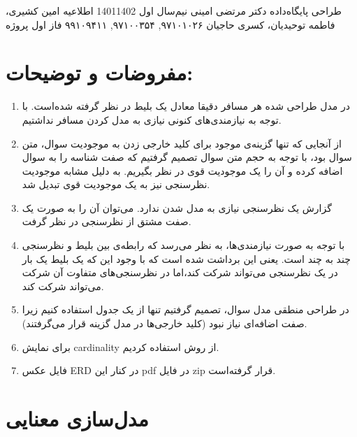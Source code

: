 \documentclass[a4paper,12pt]{article}
\begin{document}
\handout
{طراحی پایگاه‌داده}
{دکتر مرتضی امینی}
{نیم‌سال اول 1401\lr{-}1402}
{اطلاعیه}
{امین کشیری، فاطمه توحیدیان، کسری حاجیان}
{۹۷۱۰۱۰۲۶, ۹۷۱۰۰۳۵۴, ۹۹۱۰۹۴۱۱}
 {فاز اول پروژه}


\section*{مفروضات و توضیحات: }
\begin{enumerate}
	\item در مدل طراحی شده هر مسافر دقیقا معادل یک بلیط در نظر گرفته شده‌است. با توجه به نیازمندی‌های 
	کنونی نیازی به مدل کردن مسافر نداشتیم. 
	\item از آنجایی که تنها گزینه‌ی موجود برای کلید خارجی زدن به موجودیت سوال، متن سوال بود، با توجه به حجم متن سوال تصمیم گرفتیم که صفت شناسه را به سوال اضافه کرده و آن را یک موجودیت قوی در نظر بگیریم. به دلیل مشابه موجودیت نظرسنجی نیز به یک موجودیت قوی تبدیل شد.
	\item گزارش یک نظرسنجی نیازی به مدل شدن ندارد. می‌توان آن  را به صورت یک صفت مشتق از 
	نظرسنجی در نظر گرفت. 
	\item با توجه به صورت نیازمندی‌ها، به نظر می‌رسد که 
	رابطه‌ی بین بلیط و نظرسنجی چند به چند است. یعنی این برداشت شده است که 
	با وجود این که یک بلیط یک بار در یک نظرسنجی می‌تواند شرکت کند،‌اما در نظرسنجی‌های 
	متفاوت آن شرکت می‌تواند شرکت کند. 
	\item در طراحی منطقی مدل سوال، تصمیم گرفتیم تنها از یک جدول استفاده کنیم 
	زیرا صفت اضافه‌ای نیاز نبود (کلید خارجی‌ها در مدل گزینه قرار می‌گرفتند).
	\item برای نمایش
	cardinality
	از روش 
	استفاده کردیم. 
	\item 
	فایل عکس 
	ERD 
	در کنار این 
	pdf 
	در فایل zip قرار گرفته‌است. 
\end{enumerate}


\section*{مدل‌سازی معنایی}
\end{document}
